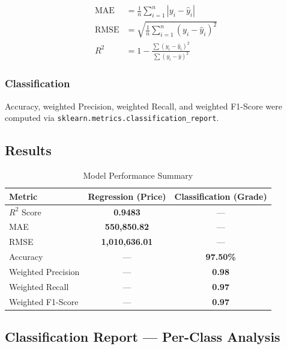 \documentclass[12pt,a4paper]{article}
\begin{document}
\begin{align}
    \text{MAE}  &= \frac{1}{n}\sum_{i=1}^{n}|y_i - \hat{y}_i| \\[6pt]
    \text{RMSE} &= \sqrt{\frac{1}{n}\sum_{i=1}^{n}(y_i - \hat{y}_i)^2} \\[6pt]
    R^2         &= 1 - \frac{\sum(y_i - \hat{y}_i)^2}{\sum(y_i - \bar{y})^2}
\end{align}

\subsubsection{Classification}

Accuracy, weighted Precision, weighted Recall, and weighted F1-Score were computed via
\texttt{sklearn.metrics.classification\_report}.

\subsection{Results}

\begin{table}[H]
\centering
\caption{Model Performance Summary}
\begin{tabular}{@{} l c c @{}}
\toprule
\textbf{Metric} & \textbf{Regression (Price)} & \textbf{Classification (Grade)} \\
\midrule
$R^2$ Score         & \textbf{0.9483}       & ---             \\
MAE                 & \textbf{550,850.82}   & ---             \\
RMSE                & \textbf{1,010,636.01} & ---             \\
Accuracy            & ---                   & \textbf{97.50\%} \\
Weighted Precision  & ---                   & \textbf{0.98}   \\
Weighted Recall     & ---                   & \textbf{0.97}   \\
Weighted F1-Score   & ---                   & \textbf{0.97}   \\
\bottomrule
\end{tabular}
\end{table}

\subsection{Classification Report --- Per-Class Analysis}
\end{document}
